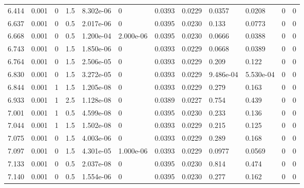 \documentclass[preview]{standalone}
\begin{document}
{{{\begin{tabular}{L{1.2cm}C{1.2cm} C{0.3cm}C{0.5cm} C{1.4cm}C{1.4cm} C{1.4cm}C{1.4cm} C{1.6cm}C{1.6cm} C{1.6cm}C{1.6cm}}
  6.414  &  0.001  & 0     & 1.5 &  8.302e-06  & 0  &  0.0393&   0.0229& 0.0357 & 0.0208   &  0 & 0  \\ 
  6.637  &  0.001  & 0     & 0.5 &  2.017e-06  & 0  &  0.0395&   0.0230& 0.133 & 0.0773   &  0 & 0  \\ 
  6.668  &  0.001  & 0     & 0.5 &  1.200e-04  & 2.000e-06  &  0.0395&   0.0230& 0.0666 & 0.0388   &  0 & 0  \\ 
  6.743  &  0.001  & 0     & 1.5 &  1.850e-06  & 0  &  0.0393&   0.0229& 0.0668 & 0.0389   &  0 & 0  \\ 
  6.764  &  0.001  & 0     & 1.5 &  2.506e-05  & 0  &  0.0393&   0.0229& 0.209 & 0.122   &  0 & 0  \\ 
  6.830  &  0.001  & 0     & 1.5 &  3.272e-05  & 0  &  0.0393&   0.0229& 9.486e-04 & 5.530e-04   &  0 & 0  \\ 
  6.844  &  0.001  & 1     & 1.5 &  1.205e-08  & 0  &  0.0393&   0.0229& 0.279 & 0.163   &  0 & 0  \\ 
  6.933  &  0.001  & 1     & 2.5 &  1.128e-08  & 0  &  0.0389&   0.0227& 0.754 & 0.439   &  0 & 0  \\ 
  7.001  &  0.001  & 1     & 0.5 &  4.599e-08  & 0  &  0.0395&   0.0230& 0.233 & 0.136   &  0 & 0  \\ 
  7.044  &  0.001  & 1     & 1.5 &  1.502e-08  & 0  &  0.0393&   0.0229& 0.215 & 0.125   &  0 & 0  \\ 
  7.075  &  0.001  & 0     & 1.5 &  4.003e-06  & 0  &  0.0393&   0.0229& 0.289 & 0.168   &  0 & 0  \\ 
  7.097  &  0.001  & 0     & 1.5 &  4.301e-05  & 1.000e-06  &  0.0393&   0.0229& 0.0977 & 0.0569   &  0 & 0  \\ 
  7.133  &  0.001  & 0     & 0.5 &  2.037e-08  & 0  &  0.0395&   0.0230& 0.814 & 0.474   &  0 & 0  \\ 
  7.140  &  0.001  & 0     & 0.5 &  1.554e-06  & 0  &  0.0395&   0.0230& 0.277 & 0.162   &  0 & 0  \\ 
\hline 
\end{tabular} 

}}}
\end{document}
